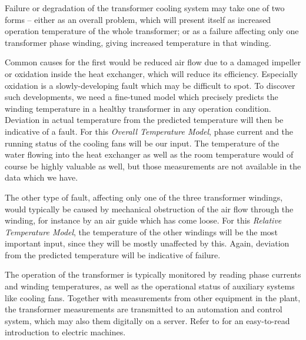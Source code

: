 \documentclass[]{article}
\begin{document}
Failure or degradation of the transformer cooling system may take one of two forms -- either as an overall problem, which will present itself as increased operation temperature of the whole transformer; or as a failure affecting only one transformer phase winding, giving increased temperature in that winding. 

Common causes for the first would be reduced air flow due to a damaged impeller or oxidation inside the heat exchanger, which will reduce its efficiency. Especially oxidation is a slowly-developing fault which may be difficult to spot. To discover such developments, we need a fine-tuned model which precisely predicts the winding temperature in a healthy transformer in any operation condition. Deviation in actual temperature from the predicted temperature will then be indicative of a fault. For this \textit{Overall Temperature Model}, phase current and the running status of the cooling fans will be our input. The temperature of the water flowing into the heat exchanger as well as the room temperature would of course be highly valuable as well, but those measurements are not available in the data which we have.

The other type of fault, affecting only one of the three transformer windings, would typically be caused by mechanical obstruction of the air flow through the winding, for instance by an air guide which has come loose. For this \textit{Relative Temperature Model}, the temperature of the other windings will be the most important input, since they will be mostly unaffected by this. Again, deviation from the predicted temperature will be indicative of failure.

The operation of the transformer is typically monitored by reading phase currents and winding temperatures, as well as the operational status of auxiliary systems like cooling fans. Together with measurements from other equipment in the plant, the transformer measurements are transmitted to an automation and control system, which may also them digitally on a server. Refer to \cite{hubert2002} for an easy-to-read introduction to electric machines.
\end{document}
